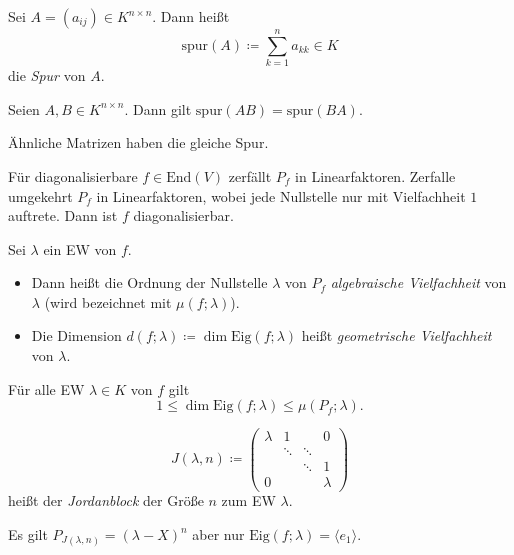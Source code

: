 \documentclass{cheat-sheet}
\newcommand{\End}{\mathrm{End}}
\newcommand{\Eig}{\mathrm{Eig}}
\newcommand{\spur}{\mathrm{spur}}
\begin{document}
\begin{defn}
Sei $A = (a_{ij}) \in K^{n \times n}$. Dann heißt
\[ \spur(A) \coloneqq \sum_{k=1}^n a_{kk} \in K \]
die \emph{Spur} von $A$.
\end{defn}

\begin{satz}
Seien $A, B \in K^{n \times n}$. Dann gilt $\spur(AB) = \spur(BA)$.
\end{satz}

\begin{kor}
Ähnliche Matrizen haben die gleiche Spur.
\end{kor}

\begin{satz}
Für diagonalisierbare $f \in \End(V)$ zerfällt $P_f$ in Linearfaktoren. Zerfalle umgekehrt $P_f$ in Linearfaktoren, wobei jede Nullstelle nur mit Vielfachheit $1$ auftrete. Dann ist $f$ diagonalisierbar.
\end{satz}

\begin{defn}
Sei $\lambda$ ein EW von $f$.
\begin{itemize}
  \item Dann heißt die Ordnung der Nullstelle $\lambda$ von $P_f$ \emph{algebraische Vielfachheit} von $\lambda$ (wird bezeichnet mit $\mu(f; \lambda)$).
  \item Die Dimension $d(f; \lambda) \coloneqq \dim \Eig(f; \lambda)$ heißt \emph{geometrische Vielfachheit} von $\lambda$.
\end{itemize}
\end{defn}

\begin{satz}
Für alle EW $\lambda \in K$ von $f$ gilt
\[ 1 \le \dim \Eig(f; \lambda) \le \mu(P_f; \lambda). \]
\end{satz}

\begin{defn}
\[ J(\lambda, n) \coloneqq \begin{pmatrix}
  \lambda & 1 & & 0 \\
  & \ddots & \ddots & \\
  & & \ddots & 1 \\
  0 & & & \lambda
\end{pmatrix} \]
heißt der \emph{Jordanblock} der Größe $n$ zum EW $\lambda$.
\end{defn}

\begin{bem}
Es gilt $P_{J(\lambda, n)} = (\lambda - X)^n$ aber nur $\Eig(f; \lambda) = \langle e_1 \rangle$.
\end{bem}
\end{document}
